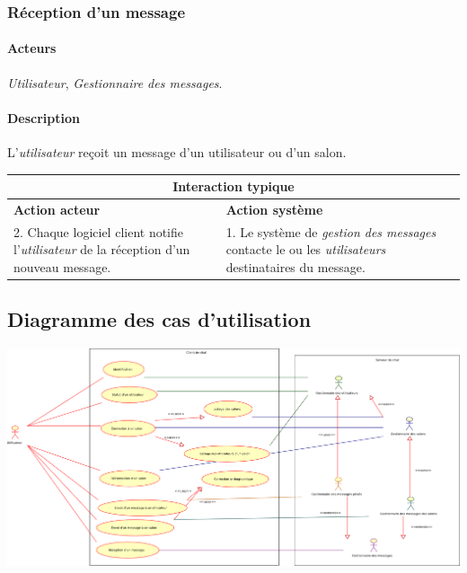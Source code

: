 \documentclass[a4paper]{article}
\begin{document}
   \subsubsection{Réception d'un message}
   \label{reception}

    \paragraph{Acteurs} \textit{Utilisateur},
    \textit{Gestionnaire des messages}.

    \paragraph{Description} L'\textit{utilisateur} reçoit un message d'un
    utilisateur ou d'un salon.

    \begin{center}
        \begin{tabular}{|p{6cm}|p{6cm}|}
            \hline
            \multicolumn{2}{|c|}{\textbf{Interaction typique}} \\ \hline
            \textbf{Action acteur} & \textbf{Action système} \\ \hline
            2. Chaque logiciel client notifie l'\textit{utilisateur} de la
            réception d'un nouveau message.
            & 1. Le système de \textit{gestion des messages} contacte le ou les
            \textit{utilisateurs} destinataires du message. \\
            \hline
        \end{tabular}
    \end{center}

 \subsection{Diagramme des cas d'utilisation}

    \includegraphics[angle=90,width=0.9\linewidth]{use_case.png}
\end{document}
